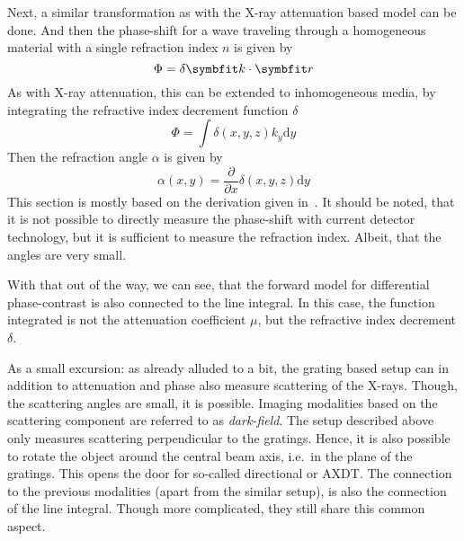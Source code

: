 Next, a similar transformation as with the X-ray attenuation based model can be done. And then the
phase-shift for a wave traveling through a homogeneous material with a single refraction index \(n\)
is given by
\begin{equation}
	\Phi = \delta \mvec{k} \cdot \mvec{r}
\end{equation}
As with X-ray attenuation, this can be extended to inhomogeneous media, by integrating the refractive
index decrement function \(\delta\)
\begin{equation}
	\Phi = \int \delta(x, y, z) k_y \mathrm{d}y
\end{equation}
Then the refraction angle \(\alpha\) is given by
\begin{equation}
	\alpha(x,y) = \frac{\partial}{\partial x} \delta(x, y, z) \mathrm{d}y
\end{equation}
This section is mostly based on the derivation given in~\cite{hahn_statistical_2014}. It should be
noted, that it is not possible to directly measure the phase-shift with current detector technology,
but it is sufficient to measure the refraction index. Albeit, that the angles are very small.

With that out of the way, we can see, that the forward model for differential phase-contrast is also
connected to the line integral. In this case, the function integrated is not the attenuation
coefficient \(\mu\), but the refractive index decrement \(\delta\).

As a small excursion: as already alluded to a bit, the grating based setup can in addition to
attenuation and phase also measure scattering of the X-rays. Though, the scattering angles are
small, it is possible. Imaging modalities based on the scattering component are referred to as
\textit{dark-field}. The setup described above only measures scattering perpendicular to the
gratings. Hence, it is also possible to rotate the object around the central beam axis, i.e.\ in the
plane of the gratings. This opens the door for so-called directional or \gls{AXDT}. The connection
to the previous modalities (apart from the similar setup), is also the connection of the line
integral. Though more complicated, they still share this common aspect.

